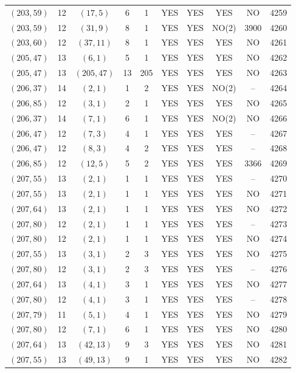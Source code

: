 \begin{longtable}{|c|c|c|c|c|c|c|c|c|c|}
$(203, 59)$ & 12 & $(17, 5)$ & 6 & 1 & YES & YES & YES & NO & 4259\\
$(203, 59)$ & 12 & $(31, 9)$ & 8 & 1 & YES & YES & NO(2) & 3900 & 4260\\
$(203, 60)$ & 12 & $(37, 11)$ & 8 & 1 & YES & YES & YES & NO & 4261\\
$(205, 47)$ & 13 & $(6, 1)$ & 5 & 1 & YES & YES & YES & NO & 4262\\
$(205, 47)$ & 13 & $(205, 47)$ & 13 & 205 & YES & YES & YES & NO & 4263\\
$(206, 37)$ & 14 & $(2, 1)$ & 1 & 2 & YES & YES & NO(2) & -- & 4264\\
$(206, 85)$ & 12 & $(3, 1)$ & 2 & 1 & YES & YES & YES & NO & 4265\\
$(206, 37)$ & 14 & $(7, 1)$ & 6 & 1 & YES & YES & NO(2) & NO & 4266\\
$(206, 47)$ & 12 & $(7, 3)$ & 4 & 1 & YES & YES & YES & -- & 4267\\
$(206, 47)$ & 12 & $(8, 3)$ & 4 & 2 & YES & YES & YES & -- & 4268\\
$(206, 85)$ & 12 & $(12, 5)$ & 5 & 2 & YES & YES & YES & 3366 & 4269\\
$(207, 55)$ & 13 & $(2, 1)$ & 1 & 1 & YES & YES & YES & -- & 4270\\
$(207, 55)$ & 13 & $(2, 1)$ & 1 & 1 & YES & YES & YES & NO & 4271\\
$(207, 64)$ & 13 & $(2, 1)$ & 1 & 1 & YES & YES & YES & NO & 4272\\
$(207, 80)$ & 12 & $(2, 1)$ & 1 & 1 & YES & YES & YES & -- & 4273\\
$(207, 80)$ & 12 & $(2, 1)$ & 1 & 1 & YES & YES & YES & NO & 4274\\
$(207, 55)$ & 13 & $(3, 1)$ & 2 & 3 & YES & YES & YES & NO & 4275\\
$(207, 80)$ & 12 & $(3, 1)$ & 2 & 3 & YES & YES & YES & -- & 4276\\
$(207, 64)$ & 13 & $(4, 1)$ & 3 & 1 & YES & YES & YES & NO & 4277\\
$(207, 80)$ & 12 & $(4, 1)$ & 3 & 1 & YES & YES & YES & -- & 4278\\
$(207, 79)$ & 11 & $(5, 1)$ & 4 & 1 & YES & YES & YES & NO & 4279\\
$(207, 80)$ & 12 & $(7, 1)$ & 6 & 1 & YES & YES & YES & NO & 4280\\
$(207, 64)$ & 13 & $(42, 13)$ & 9 & 3 & YES & YES & YES & NO & 4281\\
$(207, 55)$ & 13 & $(49, 13)$ & 9 & 1 & YES & YES & YES & NO & 4282\\

\end{longtable}
